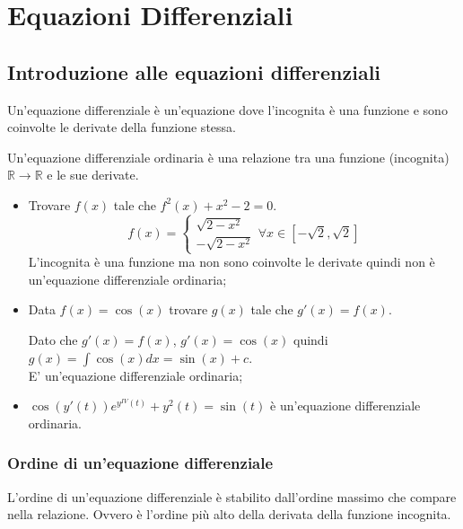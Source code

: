 \part{Equazioni Differenziali}

\chapter{Introduzione alle equazioni differenziali}
Un'equazione differenziale è un'equazione dove l'incognita è una funzione e sono coinvolte le derivate della funzione stessa.

\begin{definition*}
    Un'equazione differenziale ordinaria è una relazione tra una funzione (incognita) $\mathbb{R}\to\mathbb{R}$ e le sue derivate.
\end{definition*}

\begin{example}\phantom{}
\begin{itemize}
    \item Trovare $f(x)$ tale che $f^2(x)+x^2-2=0$.
        $$f(x)=\begin{cases}\sqrt{2-x^2}\\-\sqrt{2-x^2}\end{cases} \forall x\in[-\sqrt{2}, \sqrt{2}]$$
        L'incognita è una funzione ma non sono coinvolte le derivate quindi non è un'equazione differenziale ordinaria;
    \item Data $f(x)=\cos(x)$ trovare $g(x)$ tale che $g'(x)=f(x)$.
    
    Dato che $g'(x)=f(x)$, $g'(x)=\cos(x)$ quindi $g(x)=\int\cos(x)dx=\sin(x)+c$.\\E' un'equazione differenziale ordinaria;
    
    \item $\cos(y'(t))e^{y^{IV}(t)}+y^2(t)=\sin(t)$ è un'equazione differenziale ordinaria.
\end{itemize}
\end{example}

\section{Ordine di un'equazione differenziale}
\begin{definition*}
    L'ordine di un'equazione differenziale è stabilito dall'ordine massimo che compare nella relazione. Ovvero è l'ordine più alto della derivata della funzione incognita.
\end{definition*}

